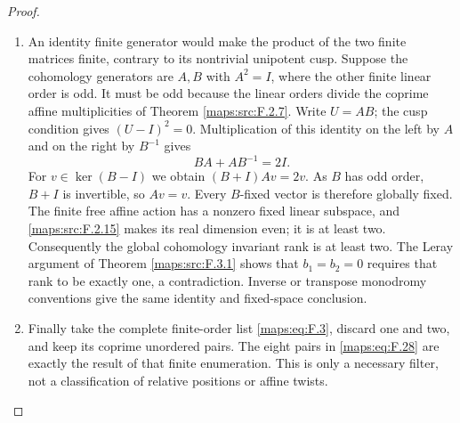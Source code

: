 \documentclass[11pt,a4paper]{article}
\theoremstyle{definition}
\begin{document}
\begin{proof}
\begin{enumerate}[label=\arabic*.]
\item An identity finite generator would make the product of the
two finite matrices finite, contrary to its nontrivial
unipotent cusp.  Suppose the cohomology generators are
$A,B$ with $A^2=I$, where the other finite linear order is
odd.  It must be odd because the linear orders divide the
coprime affine multiplicities of Theorem \ref{maps:src:F.2.7}.
Write $U=AB$; the cusp condition gives $(U-I)^2=0$.
Multiplication of this identity on the left by $A$ and on
the right by $B^{-1}$ gives
\[
 BA+AB^{-1}=2I.
 \tag{F.29}\label{maps:eq:F.29}
\]
For $v\in\ker(B-I)$ we obtain $(B+I)Av=2v$.
As $B$ has odd order, $B+I$ is invertible, so $Av=v$.
Every $B$-fixed vector is therefore globally fixed.
The finite free affine action has a nonzero fixed
linear subspace, and \ref{maps:src:F.2.15} makes its real dimension even; it is
at least two.  Consequently the global cohomology invariant
rank is at least two.  The Leray argument of Theorem \ref{maps:src:F.3.1}
shows that $b_1=b_2=0$ requires that rank to be exactly one,
a contradiction.  Inverse or transpose monodromy conventions
give the same identity and fixed-space conclusion.

\item Finally take the complete finite-order list \eqref{maps:eq:F.3}, discard
one and two, and keep its coprime unordered pairs.
The eight pairs in \eqref{maps:eq:F.28} are exactly the result of that
finite enumeration.  This is only a necessary filter, not
a classification of relative positions or affine twists.

\end{enumerate}
\end{proof}
\end{document}
